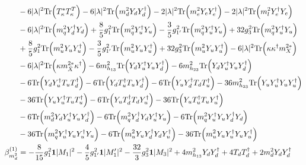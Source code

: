 {\begin{align}
 &-6 |\lambda|^2 \mbox{Tr}\Big({T_{\kappa}^*  T_{\kappa}^{T}}\Big) -6 |\lambda|^2 \mbox{Tr}\Big({m_d^2  Y_d  Y_{d}^{\dagger}}\Big) -2 |\lambda|^2 \mbox{Tr}\Big({m_e^2  Y_e  Y_{e}^{\dagger}}\Big) -2 |\lambda|^2 \mbox{Tr}\Big({m_l^2  Y_{e}^{\dagger}  Y_e}\Big) \nonumber \\ 
 &-6 |\lambda|^2 \mbox{Tr}\Big({m_q^2  Y_{d}^{\dagger}  Y_d}\Big) +\frac{8}{5} g_{1}^{2} \mbox{Tr}\Big({m_q^2  Y_{u}^{\dagger}  Y_u}\Big) -\frac{3}{5} g_{1'}^{2} \mbox{Tr}\Big({m_q^2  Y_{u}^{\dagger}  Y_u}\Big) +32 g_{3}^{2} \mbox{Tr}\Big({m_q^2  Y_{u}^{\dagger}  Y_u}\Big) \nonumber \\ 
 &+\frac{8}{5} g_{1}^{2} \mbox{Tr}\Big({m_u^2  Y_u  Y_{u}^{\dagger}}\Big) -\frac{3}{5} g_{1'}^{2} \mbox{Tr}\Big({m_u^2  Y_u  Y_{u}^{\dagger}}\Big) +32 g_{3}^{2} \mbox{Tr}\Big({m_u^2  Y_u  Y_{u}^{\dagger}}\Big) -6 |\lambda|^2 \mbox{Tr}\Big({\kappa  \kappa^{\dagger}  m_{X}^{2 *}}\Big) \nonumber \\ 
 &-6 |\lambda|^2 \mbox{Tr}\Big({\kappa  m_{\bar{X}}^{2 *}  \kappa^{\dagger}}\Big) -6 m_{h_{13}}^2 \mbox{Tr}\Big({Y_d  Y_{u}^{\dagger}  Y_u  Y_{d}^{\dagger}}\Big) -6 m_{h_{23}}^2 \mbox{Tr}\Big({Y_d  Y_{u}^{\dagger}  Y_u  Y_{d}^{\dagger}}\Big) \nonumber \\ 
 &-6 \mbox{Tr}\Big({Y_d  Y_{u}^{\dagger}  T_u  T_{d}^{\dagger}}\Big) -6 \mbox{Tr}\Big({Y_d  T_{u}^{\dagger}  T_u  Y_{d}^{\dagger}}\Big) -6 \mbox{Tr}\Big({Y_u  Y_{d}^{\dagger}  T_d  T_{u}^{\dagger}}\Big) -36 m_{h_{23}}^2 \mbox{Tr}\Big({Y_u  Y_{u}^{\dagger}  Y_u  Y_{u}^{\dagger}}\Big) \nonumber \\ 
 &-36 \mbox{Tr}\Big({Y_u  Y_{u}^{\dagger}  T_u  T_{u}^{\dagger}}\Big) -6 \mbox{Tr}\Big({Y_u  T_{d}^{\dagger}  T_d  Y_{u}^{\dagger}}\Big) -36 \mbox{Tr}\Big({Y_u  T_{u}^{\dagger}  T_u  Y_{u}^{\dagger}}\Big) \nonumber \\ 
 &-6 \mbox{Tr}\Big({m_d^2  Y_d  Y_{u}^{\dagger}  Y_u  Y_{d}^{\dagger}}\Big) -6 \mbox{Tr}\Big({m_q^2  Y_{d}^{\dagger}  Y_d  Y_{u}^{\dagger}  Y_u}\Big) -6 \mbox{Tr}\Big({m_q^2  Y_{u}^{\dagger}  Y_u  Y_{d}^{\dagger}  Y_d}\Big) \nonumber \\ 
 &-36 \mbox{Tr}\Big({m_q^2  Y_{u}^{\dagger}  Y_u  Y_{u}^{\dagger}  Y_u}\Big) -6 \mbox{Tr}\Big({m_u^2  Y_u  Y_{d}^{\dagger}  Y_d  Y_{u}^{\dagger}}\Big) -36 \mbox{Tr}\Big({m_u^2  Y_u  Y_{u}^{\dagger}  Y_u  Y_{u}^{\dagger}}\Big) \\ 
\beta_{m_d^2}^{(1)} & =  
-\frac{8}{15} g_{1}^{2} {\bf 1} |M_1|^2 -\frac{4}{5} g_{1'}^{2} {\bf 1} |M_1'|^2 -\frac{32}{3} g_{3}^{2} {\bf 1} |M_3|^2 +4 m_{h_{13}}^2 {Y_d  Y_{d}^{\dagger}} +4 {T_d  T_{d}^{\dagger}} +2 {m_d^2  Y_d  Y_{d}^{\dagger}} \nonumber \\ 

\end{align}}
